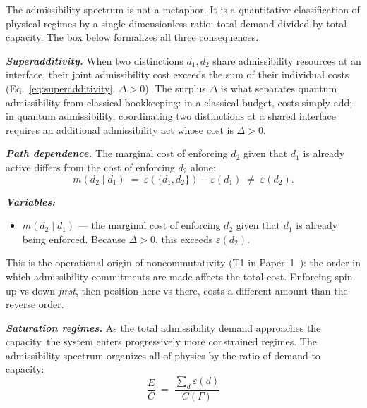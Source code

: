 \documentclass[11pt]{article}
\newenvironment{varlist}{\begin{itemize}[nosep,leftmargin=2em]}{\end{itemize}}
\begin{document}
The admissibility spectrum is not a metaphor.  It is a quantitative classification of physical regimes by a single dimensionless ratio: total demand divided by total capacity.  The box below formalizes all three consequences.


\begin{tcolorbox}[apfbox, title={Consequences of $L_{\mathrm{nc}}^{\mathrm{interf}}$: Superadditivity, Path Dependence, Saturation}]

\textbf{\textit{Superadditivity.}}  When two distinctions $d_1, d_2$ share admissibility resources at an interface, their joint admissibility cost exceeds the sum of their individual costs (Eq.~\ref{eq:superadditivity}, $\Delta > 0$).  The surplus $\Delta$ is what separates quantum admissibility from classical bookkeeping: in a classical budget, costs simply add; in quantum admissibility, coordinating two distinctions at a shared interface requires an additional admissibility act whose cost is $\Delta > 0$.

\medskip
\textbf{\textit{Path dependence.}}  The marginal cost of enforcing $d_2$ given that $d_1$ is already active differs from the cost of enforcing $d_2$ alone:
\begin{equation}
m(d_2 \mid d_1) \;=\; \varepsilon(\{d_1, d_2\}) - \varepsilon(d_1) \;\ne\; \varepsilon(d_2).
\label{eq:path_dependence}
\end{equation}

\smallskip\noindent\textbf{\textit{Variables:}}
\begin{varlist}
\item $m(d_2 \mid d_1)$ --- the marginal cost of enforcing $d_2$ given that $d_1$ is already being enforced.  Because $\Delta > 0$, this exceeds $\varepsilon(d_2)$.
\end{varlist}

This is the operational origin of noncommutativity (T1 in Paper~1~\cite{BrookePaper1}): the order in which admissibility commitments are made affects the total cost.  Enforcing spin-up-vs-down \emph{first}, then position-here-vs-there, costs a different amount than the reverse order.

\medskip
\textbf{\textit{Saturation regimes.}}  As the total admissibility demand approaches the capacity, the system enters progressively more constrained regimes.  The admissibility spectrum organizes all of physics by the ratio of demand to capacity:
\begin{equation}
\frac{E}{C} \;=\; \frac{\sum_d \varepsilon(d)}{C(\Gamma)}
\label{eq:saturation_ratio}
\end{equation}


\end{tcolorbox}
\end{document}
